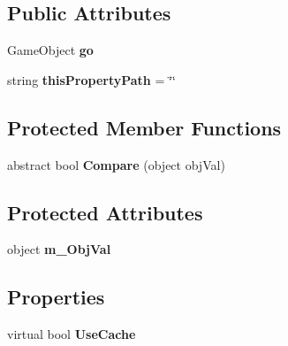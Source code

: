 \subsection*{Public Attributes}
\begin{DoxyCompactItemize}
\item 
\mbox{\label{class_unity_test_1_1_action_base_a75f5fc3018714844cd668e877bb11d32}} 
Game\+Object {\bfseries go}
\item 
\mbox{\label{class_unity_test_1_1_action_base_ad65fa0a8ce715dba031b97ba94cb9df4}} 
string {\bfseries this\+Property\+Path} = \char`\"{}\char`\"{}
\end{DoxyCompactItemize}
\subsection*{Protected Member Functions}
\begin{DoxyCompactItemize}
\item 
\mbox{\label{class_unity_test_1_1_action_base_a32c9f658aa520be44a3dbbfc5eabdcd8}} 
abstract bool {\bfseries Compare} (object obj\+Val)
\end{DoxyCompactItemize}
\subsection*{Protected Attributes}
\begin{DoxyCompactItemize}
\item 
\mbox{\label{class_unity_test_1_1_action_base_ab1ff380d779e372eed0bc1c7cf24fb1f}} 
object {\bfseries m\+\_\+\+Obj\+Val}
\end{DoxyCompactItemize}
\subsection*{Properties}
\begin{DoxyCompactItemize}
\item 
\mbox{\label{class_unity_test_1_1_action_base_a93416254e69639f92e896185fa5592cc}} 
virtual bool {\bfseries Use\+Cache}
\end{DoxyCompactItemize}
